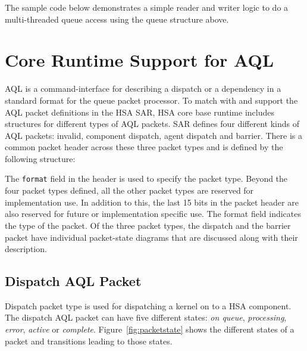 \documentclass{book}
\begin{document}
The sample code below demonstrates a simple reader and writer logic
to do a multi-threaded queue access using the queue structure above.




\hypertarget{coreapi_AQL}{}\section{Core Runtime Support for
AQL}\label{AQL}
AQL is a command-interface for describing a dispatch or a dependency
in a standard format for the queue packet processor.
To match with and support the AQL packet definitions in the HSA SAR,
HSA core base runtime includes structures for different types of AQL
packets.  SAR defines four different kinds of AQL packets: invalid,
component dispatch, agent dispatch and barrier.  There is a common
packet header across these three packet types and is defined by the
following structure:



The \texttt{format} field in the header is used to specify
the packet type. Beyond the four packet types defined, all the
other packet types are reserved for implementation use. In addition
to this, the last 15 bits in the packet header are also reserved for
future or implementation specific use. The format field indicates
the type of the packet. Of the three packet types, the
dispatch and the barrier packet have individual packet-state
diagrams that are discussed along with their description.


\hypertarget{dispatch_packet}{}\subsection{Dispatch AQL
Packet}\label{dispatch_packet}

Dispatch packet type is used for dispatching a kernel on to a HSA
component. The dispatch AQL packet can have five different states:
\emph{on queue}, \emph{processing}, \emph{error}, \emph{active} or
\emph{complete}. Figure~\ref{fig:packetstate} shows the different
states of a packet and transitions leading to those states.
\end{document}
